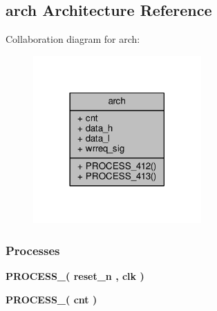 \subsection{arch Architecture Reference}
\label{classfx3__fifo__data_1_1arch}


Collaboration diagram for arch\+:\nopagebreak
\begin{figure}[H]
\begin{center}
\leavevmode
\includegraphics[width=182pt]{d1/d6f/classfx3__fifo__data_1_1arch__coll__graph}
\end{center}
\end{figure}
\subsubsection*{Processes}
 \begin{DoxyCompactItemize}
\item 
{\bf P\+R\+O\+C\+E\+S\+S\+\_}{\bfseries  ( {\bfseries {\bfseries {\bf reset\+\_\+n}} \textcolor{vhdlchar}{ }} , {\bfseries {\bfseries {\bf clk}} \textcolor{vhdlchar}{ }} )}
\item 
{\bf P\+R\+O\+C\+E\+S\+S\+\_}{\bfseries  ( {\bfseries {\bfseries {\bf cnt}} \textcolor{vhdlchar}{ }} )}
\end{DoxyCompactItemize}
